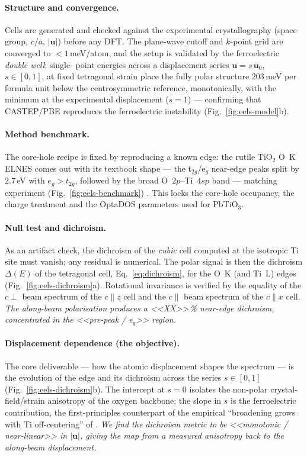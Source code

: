 \paragraph{Structure and convergence.}
Cells are generated and checked against the experimental crystallography (space group,
$c/a$, $|\mathbf{u}|$) before any DFT. The plane-wave cutoff and $k$-point grid are converged
to $<1$\,meV/atom, and the setup is validated by the ferroelectric \emph{double well}: single-
point energies across a displacement series $\mathbf{u}=s\,\mathbf{u}_0$, $s\in[0,1]$, at fixed
tetragonal strain place the fully polar structure $203$\,meV per formula unit below the
centrosymmetric reference, monotonically, with the minimum at the experimental displacement
($s\!=\!1$) --- confirming that CASTEP/PBE reproduces the ferroelectric instability
(Fig.~\ref{fig:eels-model}b).

\paragraph{Method benchmark.}
The core-hole recipe is fixed by reproducing a known edge: the rutile TiO$_2$ O~K ELNES comes
out with its textbook shape --- the t$_{2g}$/e$_g$ near-edge peaks split by $2.7$\,eV with
$e_g>t_{2g}$, followed by the broad O~$2p$--Ti~$4sp$ band --- matching experiment
(Fig.~\ref{fig:eels-benchmark}) \citep{Mizoguchi2009}. This locks the core-hole occupancy,
the charge treatment and the OptaDOS parameters used for PbTiO$_3$.

\paragraph{Null test and dichroism.}
As an artifact check, the dichroism of the \emph{cubic} cell computed at the isotropic Ti site
must vanish; any residual is numerical. The polar signal is then the dichroism
$\Delta(E)$ of the tetragonal cell, Eq.~\eqref{eq:dichroism}, for the O~K (and Ti~L) edges
(Fig.~\ref{fig:eels-dichroism}a). Rotational invariance is verified by the equality of the
$c\perp$ beam spectrum of the $c\!\parallel\! z$ cell and the $c\!\parallel\!$ beam spectrum
of the $c\!\parallel\! x$ cell. \emph{The along-beam polarisation produces a
<<XX>>\,\% near-edge dichroism, concentrated in the <<pre-peak / e$_g$>> region.}

\paragraph{Displacement dependence (the objective).}
The core deliverable --- how the atomic displacement shapes the spectrum --- is the evolution
of the edge and its dichroism across the series $s\in[0,1]$ (Fig.~\ref{fig:eels-dichroism}b).
The intercept at $s\!=\!0$ isolates the non-polar crystal-field/strain anisotropy of the
oxygen backbone; the slope in $s$ is the ferroelectric contribution, the first-principles
counterpart of the empirical ``broadening grows with Ti off-centering'' of
\citet{Bugnet2016}. \emph{We find the dichroism metric to be <<monotonic / near-linear>> in
$|\mathbf{u}|$, giving the map from a measured anisotropy back to the along-beam displacement.}

